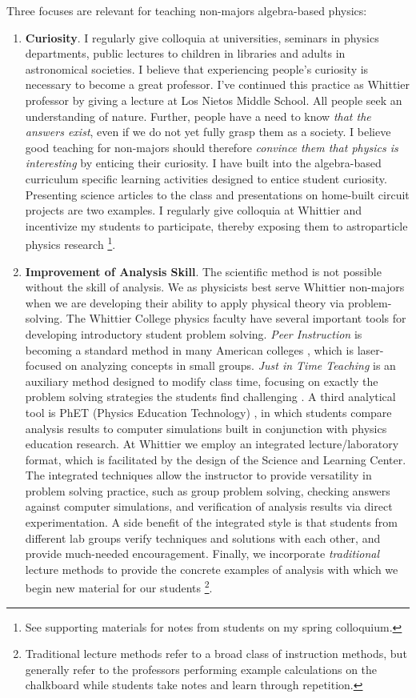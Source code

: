 \documentclass[../../main.tex]{subfiles}
\begin{document}
Three focuses are relevant for teaching non-majors algebra-based physics:
\begin{enumerate}
\item \textbf{Curiosity}.  I regularly give colloquia at universities, seminars in physics departments, public lectures to children in libraries and adults in astronomical societies.  I believe that experiencing people's curiosity is necessary to become a great professor.  I've continued this practice as Whittier professor by giving a lecture at Los Nietos Middle School.  All people seek an understanding of nature.  Further, people have a need to know \textit{that the answers exist}, even if we do not yet fully grasp them as a society.  I believe good teaching for non-majors should therefore \textit{convince them that physics is interesting} by enticing their curiosity.  I have built into the algebra-based curriculum specific learning activities designed to entice student curiosity.  Presenting science articles to the class and presentations on home-built circuit projects are two examples.  I regularly give colloquia at Whittier and incentivize my students to participate, thereby exposing them to astroparticle physics research \footnote{See supporting materials for notes from students on my spring colloquium.}.

\item \textbf{Improvement of Analysis Skill}.  The scientific method is not possible without the skill of analysis.  We as physicists best serve Whittier non-majors when we are developing their ability to apply physical theory via problem-solving.  The Whittier College physics faculty have several important tools for developing introductory student problem solving.  \textit{Peer Instruction} is becoming a standard method in many American colleges \cite{mazur}, which is laser-focused on analyzing concepts in small groups.  \textit{Just in Time Teaching} is an auxiliary method designed to modify class time, focusing on exactly the problem solving strategies the students find challenging \cite{howpeoplelearn}.  A third analytical tool is PhET (Physics Education Technology) \cite{phet}, in which students compare analysis results to computer simulations built in conjunction with physics education research.  At Whittier we employ an integrated lecture/laboratory format, which is facilitated by the design of the Science and Learning Center.  The integrated techniques allow the instructor to provide versatility in problem solving practice, such as group problem solving, checking answers against computer simulations, and verification of analysis results via direct experimentation.  A side benefit of the integrated style is that students from different lab groups verify techniques and solutions with each other, and provide much-needed encouragement.  Finally, we incorporate \textit{traditional} lecture methods to provide the concrete examples of analysis with which we begin new material for our students \footnote{Traditional lecture methods refer to a broad class of instruction methods, but generally refer to the professors performing example calculations on the chalkboard while students take notes and learn through repetition.}.


\end{enumerate}
\end{document}
